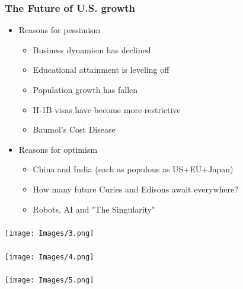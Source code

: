 \documentclass[serif,professionalfont,red,aspectratio=169]{beamer}
\begin{document}
\begin{frame}[t]
\frametitle{The Future of U.S. growth}
\vspace{2mm}
\begin{itemize}
\item Reasons for pessimism 
\vspace{2mm}
\begin{itemize}
\item Business dynamism has declined
\vspace{2mm}
\item Educational attainment is leveling off 
\vspace{2mm}
\item \textcolor{blues}{Population growth has fallen} 
\vspace{2mm}
\item \textcolor{blues}{H-1B visas have become more restrictive} 
\vspace{2mm}
\item \textcolor{blues}{Baumol's Cost Disease}
\vspace{4mm}
\end{itemize}
\item Reasons for optimism 
\vspace{2mm}
\begin{itemize}
\item China and India (each as populous as US+EU+Japan) 
\vspace{2mm}
\item How many future Curies and Edisons await everywhere? 
\vspace{2mm}
\item Robots, AI and "The Singularity"
\end{itemize}
\end{itemize}
\end{frame}
\begin{frame}[t]
\frametitle{}
\begin{center}
\texttt{[image: Images/3.png]}
\end{center}
\end{frame}
\begin{frame}[t]
\frametitle{}
\begin{center}
\texttt{[image: Images/4.png]}
\end{center}
\end{frame}
\begin{frame}[t]
\frametitle{}
\begin{center}
\texttt{[image: Images/5.png]}
\end{center}
\end{frame}
\end{document}
